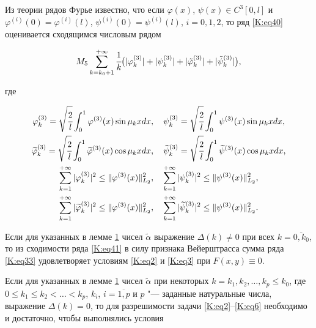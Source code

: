 Из теории рядов Фурье известно, что если $\varphi (x)$, $\psi(x) \in C^3[0,l]$ и $\varphi^{(i)}(0)=\varphi^{(i)}(l)$, $\psi^{(i)}(0)=\psi^{(i)}(l)$, $i=0, 1, 2$, то ряд \eqref{K:eq40} оценивается сходящимся числовым рядом

\begin{equation}

\label{K:eq41}

M_5 \sum \limits_{k=k_{0}+1}^{+\infty} \cfrac 1 k \bigl(|\varphi_k^{(3)} | + |\psi_k^{(3)} | + |\tilde{\varphi}_k^{(3)} |+ |\tilde{\psi}_k^{(3)} |\bigr),

\end{equation}

где

\begin{gather*}

\varphi_k^{(3)}=\sqrt{\cfrac 2 l} \int _0^1 \varphi^{(3)} (x) \sin \mu_k x dx, \quad \psi_k^{(3)}=\sqrt{\cfrac 2 l} \int _0^1 \psi^{(3)} (x) \sin \mu_k x dx,\\

\widetilde{\varphi}_k^{(3)}=\sqrt{\cfrac 2 l} \int _0^1 \widetilde{\varphi}^{(3)} (x) \cos \mu_k x dx, \quad \widetilde{\psi}_k^{(3)}=\sqrt{\cfrac 2 l} \int _0^1 \widetilde{\psi}^{(3)} (x) \cos \mu_k x dx,\\

\sum \limits_{k=1}^{+\infty} |\varphi_k^{(3)} |^2 \leq \|\varphi^{(3)}(x) \|^2_{L_2}, \quad 

\sum \limits_{k=1}^{+\infty} |\psi_k^{(3)} |^2 \leq \|\psi^{(3)}(x) \|^2_{L_2},\\

\sum \limits_{k=1}^{+\infty} |\widetilde{\varphi}_k^{(3)} |^2 \leq \|\varphi^{(3)}(x) \|^2_{L_2}, \quad 

\sum \limits_{k=1}^{+\infty} |\widetilde{\psi}_k^{(3)} |^2 \leq  \|\psi^{(3)}(x) \|^2_{L_2}.

\end{gather*}



Если для указанных в лемме \hyperlink{gu:lemma1}{\rm 1} чисел $\tilde{\alpha}$ выражение $\Delta(k) \neq 0$ при всех $k=\overline{0, k_0}$, то из сходимости ряда \eqref{K:eq41} в силу признака Вейерштрасса сумма ряда \eqref{K:eq33} удовлетворяет условиям \eqref{K:eq2} и \eqref{K:eq3} при $F(x,y)\equiv0$.



Если для указанных в лемме \hyperlink{gu:lemma1}{\rm 1}  чисел $\tilde{\alpha}$ при некоторых $k=k_1, k_2, \ldots, k_p \leq k_0$, где $0 \leq k_1 \leq k_2 < \ldots <k_p$, $k_i$, $i=\overline{1, p}$ и $p$ "--- заданные натуральные числа, выражение $\Delta(k)=0$, то для разрешимости задачи \eqref{K:eq2}--\eqref{K:eq6} необходимо и достаточно, чтобы выполнялись условия

